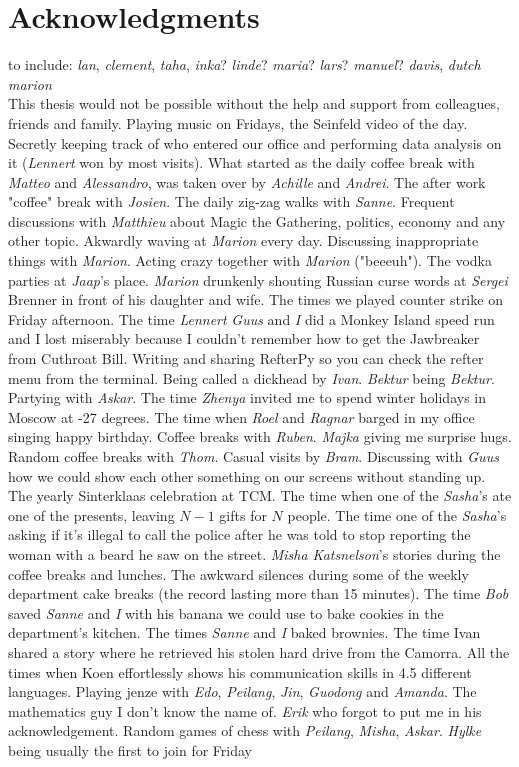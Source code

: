 \chapter*{Acknowledgments}
to include: \emph{lan}, \emph{clement}, \emph{taha}, \emph{inka}? \emph{linde}? \emph{maria}? \emph{lars}? \emph{manuel}? \emph{davis}, \emph{dutch marion}\\
This thesis would not be possible without the help and support from colleagues, friends and family. Playing music on Fridays, the Seinfeld video of the day. Secretly keeping track of who entered our office and performing data analysis on it (\emph{Lennert} won by most visits). What started as the daily coffee break with \emph{Matteo} and \emph{Alessandro}, was taken over by \emph{Achille} and \emph{Andrei}. The after work "coffee" break with \emph{Josien}. The daily zig-zag walks with \emph{Sanne}. Frequent discussions with \emph{Matthieu} about Magic the Gathering, politics, economy and any other topic. Akwardly waving at \emph{Marion} every day. Discussing inappropriate things with \emph{Marion}. Acting crazy together with \emph{Marion} ("beeeuh"). The vodka parties at \emph{Jaap}'s place. \emph{Marion} drunkenly shouting Russian curse words at \emph{Sergei} Brenner in front of his daughter and wife. The times we played counter strike on Friday afternoon. The time \emph{Lennert} \emph{Guus} and \emph{I} did a Monkey Island speed run and I lost miserably because I couldn't remember how to get the Jawbreaker from Cuthroat Bill. Writing and sharing RefterPy so you can check the refter menu from the terminal. Being called a dickhead by \emph{Ivan}. \emph{Bektur} being \emph{Bektur}. Partying with \emph{Askar}. The time \emph{Zhenya} invited me to spend winter holidays in Moscow at -27 degrees. The time when \emph{Roel} and \emph{Ragnar} barged in my office singing happy birthday. Coffee breaks with \emph{Ruben}. \emph{Majka} giving me surprise hugs. Random coffee breaks with \emph{Thom}. Casual visits by \emph{Bram}. Discussing with \emph{Guus} how we could show each other something on our screens without standing up. The yearly Sinterklaas celebration at TCM. The time when one of the \emph{Sasha}'s ate one of the presents, leaving $N-1$ gifts for $N$ people. The time one of the \emph{Sasha}'s asking if it's illegal to call the police after he was told to stop reporting the woman with a beard he saw on the street. \emph{Misha Katsnelson}'s stories during the coffee breaks and lunches. The awkward silences during some of the weekly department cake breaks (the record lasting more than 15 minutes). The time \emph{Bob} saved \emph{Sanne} and \emph{I} with his banana we could use to bake cookies in the department's kitchen. The times \emph{Sanne} and \emph{I} baked brownies. The time Ivan shared a story where he retrieved his stolen hard drive from the Camorra. All the times when Koen effortlessly shows his communication skills in 4.5 different languages. Playing jenze with \emph{Edo}, \emph{Peilang}, \emph{Jin}, \emph{Guodong} and \emph{Amanda}. The mathematics guy I don't know the name of. \emph{Erik} who forgot to put me in his acknowledgement. Random games of chess with \emph{Peilang}, \emph{Misha}, \emph{Askar}. \emph{Hylke} being usually the first to join for Friday 